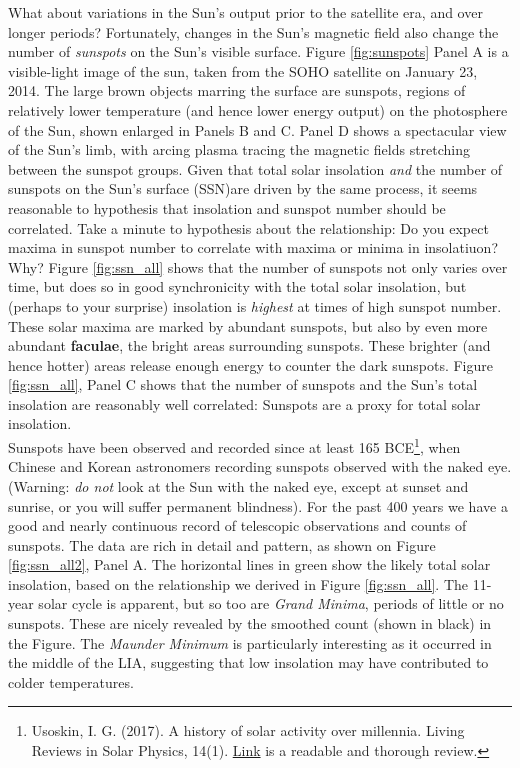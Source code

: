 \documentclass[amstex,12pt]{book}
\begin{document}
What about variations in the Sun’s output prior to the satellite era, and over longer periods? Fortunately, changes in the Sun's magnetic field also change the number of \emph{sunspots} on the Sun's visible surface. Figure \ref{fig:sunspots} Panel A is a visible-light image of the sun, taken from the SOHO satellite on January 23, 2014. The large brown objects marring the surface are sunspots, regions of relatively lower temperature (and hence lower energy output) on the photosphere of the Sun, shown enlarged in Panels B and C. Panel D shows a spectacular view of the Sun's limb, with arcing plasma tracing the magnetic fields stretching between the sunspot groups. Given that total solar insolation \textit{and} the number of sunspots on the Sun's surface (SSN)are driven by the same process, it seems reasonable to hypothesis that insolation and sunspot number should be correlated. Take a minute to hypothesis about the relationship: Do you expect maxima in sunspot number to correlate with maxima or minima in insolatiuon? Why? Figure \ref{fig:ssn_all} shows that the number of sunspots not only varies over time, but does so in good synchronicity with the total solar insolation, but (perhaps to your surprise) insolation is \textit{highest} at times of high sunspot number. These solar maxima are marked by abundant sunspots, but also by even more abundant \textbf{faculae}, the bright areas surrounding sunspots. These brighter (and hence hotter) areas release enough energy to counter the dark sunspots. Figure \ref{fig:ssn_all}, Panel C shows that the number of sunspots and the Sun's total insolation are reasonably well correlated: Sunspots are a proxy for total solar insolation.\\

Sunspots have been observed and recorded since at least 165 BCE\footnote{Usoskin, I. G. (2017). A history of solar activity over millennia. Living Reviews in Solar Physics, 14(1). \href{https://doi.org/10.1007/s41116-017-0006-9}{Link} is a readable and thorough review.}, when Chinese and Korean astronomers recording sunspots observed with the naked eye. (Warning: \emph{do not} look at the Sun with the naked eye, except at sunset and sunrise, or you will suffer permanent blindness). For the past 400 years we have a good and nearly continuous record of telescopic observations and counts of sunspots. The data are rich in detail and pattern, as shown on Figure \ref{fig:ssn_all2}, Panel A. The horizontal lines in green show the likely total solar insolation, based on the relationship we derived in Figure \ref{fig:ssn_all}. The 11-year solar cycle is apparent, but so too are \textit{Grand Minima}, periods of little or no sunspots. These are nicely revealed by the smoothed count (shown in black) in the Figure.  The \emph{Maunder Minimum} is particularly interesting as it occurred in the middle of the LIA, suggesting that low insolation may have contributed to colder temperatures. \\
\end{document}
